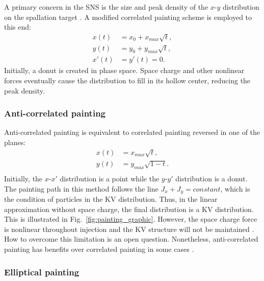 A primary concern in the SNS is the size and peak density of the $x$-$y$ distribution on the spallation target \cite{Riemer2010}. A modified correlated painting scheme is employed to this end:
%
\begin{equation}
\begin{aligned}
    {x}(t) &= x_0 + x_{max}\sqrt{t}, \\
    {y}(t) &= y_0 + y_{max}\sqrt{t}, \\
    x'(t) &= y'(t) = 0.
\end{aligned}
\end{equation}
%
Initially, a donut is created in phase space. Space charge and other nonlinear forces eventually cause the distribution to fill in its hollow center, reducing the peak density.


\subsubsection{Anti-correlated painting}

Anti-correlated painting is equivalent to correlated painting reversed in one of the planes:
%
\begin{equation}
\begin{aligned}
    {x}(t) &= x_{max}\sqrt{t}, \\
    {y}(t) &= y_{max}\sqrt{1 - t}. \\
\end{aligned}
\end{equation}
%
Initially, the $x$-$x'$ distribution is a point while the $y$-$y'$ distribution is a donut. The painting path in this method follows the line $J_x + J_y = constant$, which is the condition of particles in the KV distribution. Thus, in the linear approximation without space charge, the final distribution is a KV distribution. This is illustrated in Fig.~\ref{fig:painting_graphic}. However, the space charge force is nonlinear throughout injection and the KV structure will not be maintained \cite{Crosbie1996}. How to overcome this limitation is an open question. Nonetheless, anti-correlated painting has benefits over correlated painting in some cases \cite{Hotchi2020}.


\subsubsection{Elliptical painting}

